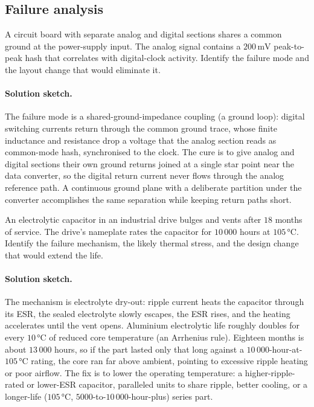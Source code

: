 \subsection*{Failure analysis}

\begin{exercise}
A circuit board with separate analog and digital sections shares a
common ground at the power-supply input. The analog signal contains a
$200\,\si{\milli\volt}$ peak-to-peak hash that correlates with
digital-clock activity. Identify the failure mode and the layout
change that would eliminate it.
\paragraph{Solution sketch.}
The failure mode is a shared-ground-impedance coupling (a ground loop):
digital switching currents return through the common ground trace,
whose finite inductance and resistance drop a voltage that the analog
section reads as common-mode hash, synchronised to the clock. The cure
is to give analog and digital sections their own ground returns joined
at a single star point near the data converter, so the digital return
current never flows through the analog reference path. A continuous
ground plane with a deliberate partition under the converter
accomplishes the same separation while keeping return paths short.
\end{exercise}

\begin{exercise}
An electrolytic capacitor in an industrial drive bulges and vents
after $18$ months of service. The drive's nameplate rates the
capacitor for $10\,000$ hours at $105\,\si{\celsius}$. Identify the
failure mechanism, the likely thermal stress, and the design change
that would extend the life.
\paragraph{Solution sketch.}
The mechanism is electrolyte dry-out: ripple current heats the
capacitor through its ESR, the sealed electrolyte slowly escapes, the
ESR rises, and the heating accelerates until the vent opens. Aluminium
electrolytic life roughly doubles for every $10\,\si{\celsius}$ of
reduced core temperature (an Arrhenius rule). Eighteen months is about
$13\,000$ hours, so if the part lasted only that long against a
$10\,000$-hour-at-$105\,\si{\celsius}$ rating, the core ran far above
ambient, pointing to excessive ripple heating or poor airflow. The fix
is to lower the operating temperature: a higher-ripple-rated or
lower-ESR capacitor, paralleled units to share ripple, better cooling,
or a longer-life ($105\,\si{\celsius}$, $5000$-to-$10\,000$-hour-plus)
series part.
\end{exercise}


